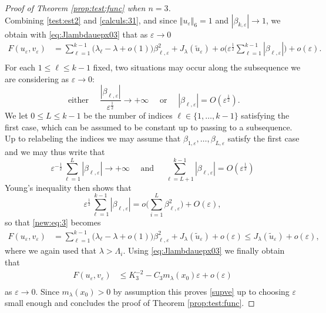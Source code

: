\documentclass[10pt]{amsart}
\numberwithin{equation}{section}
\newcommand{\ve}{\varepsilon}
\theoremstyle{plain}
\theoremstyle{remark}
\begin{document}
\begin{proof}[Proof of Theorem \ref{prop:test:func} when $n=3$]
\begin{equation}
\end{equation}
Combining \eqref{test:est2} and \eqref{calculs:31}, and since $\Vert u_\ve \Vert_{6} = 1$ and $|\beta_{k, \ve}| \to 1$, we obtain with \eqref{eq:Jlambdauepx03} that as $\ve \to 0$
\begin{equation} \label{new:eq:3}
\begin{aligned}
F(u_\ve, v_\ve) & =   \sum_{\ell=1}^{k-1} \big(\lambda_\ell - \lambda + o(1) \big) \beta_{\ell,\ve}^2 + J_{\lambda}(\tilde{u}_\ve) + o\Big(  \ve^{\frac12} \sum_{\ell=1}^{k-1} |\beta_{\ell,\ve}| \Big) + o(\ve). \\
\end{aligned} 
\end{equation}
For each $1 \le \ell \le k-1$ fixed, two situations may occur along the subsequence we are considering as $\ve \to 0$: 
\begin{equation*} 
 \text{ either } \quad \frac{|\beta_{\ell,\ve}| }{\ve^{\frac{1}{2}}} \to + \infty \quad \text{ or } \quad  |\beta_{\ell,\ve}| = O(\ve^{\frac{1}{2}}).
 \end{equation*}
We let $0 \le L \le k-1$ be the number of indices $\ell \in \{1, \dots, k-1\}$ satisfying the first case, which can be assumed to be constant up to passing to a subsequence. Up to relabeling the indices we may assume that $\beta_{1, \ve}, \dots, \beta_{L,\ve}$ satisfy the first case and we may thus write that 
\begin{equation*}
 \ve^{-\frac{1}{2}}  \sum_{\ell=1}^L |\beta_{\ell,\ve}| \to + \infty  \quad \text{ and } \quad   \sum_{\ell = L+1}^{k-1} |\beta_{\ell,\ve}| = O (\ve^{\frac{1}{2}})
 \end{equation*}
Young's inequality then shows that 
$$ \ve^{\frac12}  \sum_{\ell=1}^{k-1} | \beta_{\ell,\ve}| =  o \Big( \sum_{i=1}^{L} \beta_{\ell,\ve}^2 \Big) +  O(\ve),  $$
so that \eqref{new:eq:3} becomes 
\begin{equation*}
\begin{aligned}
F(u_\ve, v_\ve) & =   \sum_{\ell=1}^{k-1} \big(\lambda_\ell - \lambda + o(1) \big) \beta_{\ell,\ve}^2 + J_{\lambda}(\tilde{u}_\ve) + o(\ve)  \le J_{\lambda}(\tilde{u}_\ve) + o(\ve) ,
\end{aligned} 
\end{equation*}
where we again used that $\lambda > \Lambda_i$.  Using \eqref{eq:Jlambdauepx03} we finally obtain that
\begin{equation*}
\begin{aligned}
F(u_\ve, v_\ve) & \le  K_3^{-2}  - C_3 m_\lambda(x_0) \ve  + o(\ve) \\
\end{aligned} 
\end{equation*}
as $\ve \to 0$. Since $m_\lambda(x_0) >0$ by assumption this proves \eqref{supve} up to choosing $\ve$ small enough and concludes the proof of Theorem \ref{prop:test:func}.
\end{proof}
\end{document}
